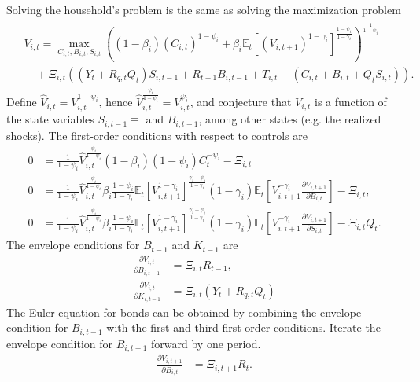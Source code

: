 \documentclass[12 pt, oneside]{article}
\theoremstyle{definition}
\theoremstyle{definition}
\theoremstyle{definition}
\newcommand{\E}{\mathbb{E}}
\begin{document}
Solving the household's problem is the same as solving the maximization problem
\begin{align}
  \begin{split}
  &V_{i, t} = \max_{C_{i, t}, B_{i, t}, S_{i, t}} \left((1 - \beta_i)\left(C_{i, t}\right)^{1 - \psi_i} + \beta_i \E_t\left[\left(V_{i, t + 1}\right)^{1 - \gamma_i}\right]^{\frac{1 - \psi_i}{1 - \gamma_i}}\right)^{\frac{1}{1 - \psi_i}}\\
  & \quad + \Xi_{i, t} \left((Y_t + R_{q, t}Q_t)S_{i, t - 1} + R_{t - 1} B_{i, t - 1} + T_{i, t} - \left(C_{i, t} + B_{i, t} + Q_tS_{i, t}\right)\right).
  \end{split}
\end{align}
Define $\hat{V}_{i, t} = V_{i, t}^{1 - \psi_i}$, hence $\hat{V}_{i, t}^{\frac{\psi_i}{1 - \psi_i}} = V_{i, t}^{\psi_i}$, and conjecture that $V_{i, t}$ is a function of the state variables $S_{i, t - 1} \equiv $ and $B_{i, t - 1}$, among other states (e.g. the realized shocks). The first-order conditions with respect to controls are
\begin{align*}
  0 & = \frac{1}{1 - \psi_i}\hat{V}_{i, t}^{\frac{\psi_i}{1 - \psi_i}} (1 - \beta_i) (1 - \psi_i)C_t^{-\psi_i}  - \Xi_{i, t}\\
  0 & = \frac{1}{1 - \psi_i}\hat{V}_{i, t}^{\frac{\psi_i}{1 - \psi_i}}\beta_i \frac{1 - \psi_i}{1 - \gamma_i}\E_t[V_{i, t + 1}^{1 - \gamma_i}]^{\frac{\gamma_i - \psi_i}{1 - \gamma_i}} (1 - \gamma_i)\E_t\left[V_{i, t + 1}^{ - \gamma_i}\frac{\partial V_{i, t + 1}}{\partial B_{i, t}}\right] - \Xi_{i, t},\\
  0 & = \frac{1}{1 - \psi_i}\hat{V}_{i, t}^{\frac{\psi_i}{1 - \psi_i}}\beta_i \frac{1 - \psi_i}{1 - \gamma_i}\E_t[V_{i, t + 1}^{1 - \gamma_i}]^{\frac{\gamma_i - \psi_i}{1 - \gamma_i}} (1 - \gamma_i)\E_t\left[V_{i, t + 1}^{ - \gamma_i}\frac{\partial V_{i, t + 1}}{\partial S_{i, t}}\right] - \Xi_{i, t} Q_t.
\end{align*}
The envelope conditions for  $B_{t - 1}$ and  $K_{t - 1}$ are
\begin{align*}
  \frac{\partial V_{i, t}}{\partial B_{i, t - 1}} & = \Xi_{i, t}R_{t - 1},\\
  \frac{\partial V_{i, t}}{\partial K_{i, t - 1}} & = \Xi_{i, t}(Y_t + R_{q, t}Q_t)
\end{align*}
The Euler equation for bonds can be obtained by combining the envelope condition for $B_{i, t - 1}$ with the first and third first-order conditions. Iterate the envelope condition for $B_{i, t - 1}$ forward by one period.
\begin{align*}
  \frac{\partial V_{i, t + 1}}{\partial B_{i, t}} & = \Xi_{i, t + 1}R_t.
\end{align*}
\end{document}
